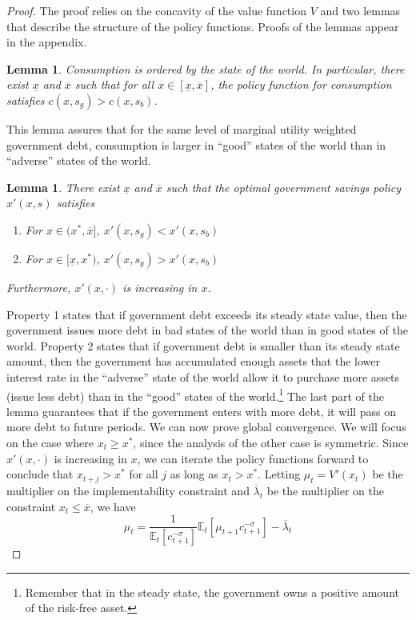 \documentclass[12pt]{article}
\newcommand{\EE}{\mathbb E}
\newtheorem{lemma}[theorem]{Lemma}
\begin{document}
\begin{proof}  {The proof relies on the concavity of the value function $V$ and  two lemmas  that describe the structure of the policy functions.  Proofs of
 the lemmas appear in the appendix.
\begin{lemma}\label{lem:c_order}  Consumption is ordered by the state of the world.  In particular, there exist $\underline x$ and $\overline x$ such that for all $x\in[\underline x,\overline x]$, the policy function for consumption satisfies $c(x,s_g) > c(x,s_b)$.
\end{lemma}  This lemma assures that for the same level of marginal utility weighted government debt, consumption is larger in ``good'' states of the world than in ``adverse'' states of the world.
\begin{lemma}\label{lem:x_order}  There exist $\underline x$ and $\overline x$ such that the optimal government savings policy $x'(x,s)$ satisfies
\begin{enumerate}
	\item For $x\in(x^*,\overline x]$, $x'(x,s_g) < x'(x,s_b)$
	\item  For $x\in[\underline x, x^*)$, $x'(x,s_g) > x'(x,s_b)$
\end{enumerate}  Furthermore, $x'(x,\cdot)$ is increasing in $x$.
\end{lemma}  Property 1 states that if government debt exceeds its steady state value, then the government issues more debt in bad states of the world than in good states of the world.  Property 2 states that if government debt is smaller than its  steady state amount, then the government 
has accumulated enough assets that 
the lower interest rate in the ``adverse'' state of the world allow it to purchase more assets (issue less debt) than in the ``good'' states of the world.\footnote{Remember that  in the steady state, the government  owns a positive amount of the risk-free asset.}     The last part of the lemma guarantees that if the government enters with more debt, it will pass on more debt to future periods.  We can now prove global convergence. We will focus on the case where $x_t \geq x^*$, since the analysis of the other case is symmetric. Since $x'(x,\cdot)$ is increasing in $x$, we can iterate the policy functions forward to conclude that $x_{t+j} > x^*$ for all $j$ as long as $x_t >x ^*$.  Letting $\mu_t = V'(x_t)$ be the multiplier on the
implementability constraint and $\overline \lambda_t$ be the multiplier on the constraint $x_t \leq \overline x$, we have
\[
	 \mu_t = \frac{1}{\EE_t[c_{t+1}^{-\sigma}]}\EE_t[\mu_{t+1}c_{t+1}^{-\sigma}] -\overline \lambda_t
\]}
\end{proof}
\end{document}
